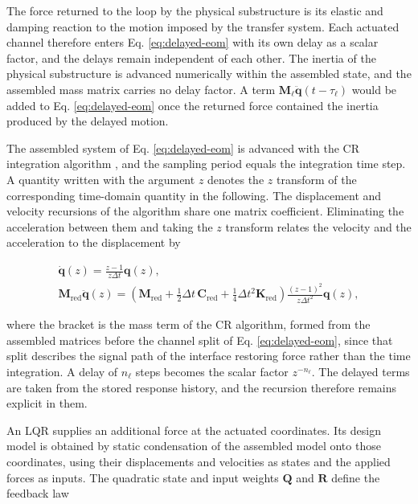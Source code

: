 \documentclass[a4paper,fleqn,review,12pt]{cas-sc}
\numberwithin{equation}{section}
\newcommand{\rev}[1]{{\color{red}#1}}
\begin{document}
The force returned to the loop by the physical substructure is its elastic and damping reaction to the motion imposed by the transfer system. Each actuated channel therefore enters Eq. \eqref{eq:delayed-eom} with its own delay as a scalar factor, and the delays remain independent of each other. The inertia of the physical substructure is advanced numerically within the assembled state, and the assembled mass matrix carries no delay factor. A term \(\mathbf{M}_{\ell}\ddot{\bm{q}}(t-\tau_{\ell})\) would be added to Eq. \eqref{eq:delayed-eom} once the returned force contained the inertia produced by the delayed motion.

The assembled system of Eq. \eqref{eq:delayed-eom} is advanced with the CR integration algorithm \rev{\cite{ChenCR2008}}, and the sampling period equals the integration time step. A quantity written with the argument \(z\) denotes the \(z\) transform of the corresponding time-domain quantity in the following. The displacement and velocity recursions of the algorithm share one matrix coefficient. Eliminating the acceleration between them and taking the \(z\) transform relates the velocity and the acceleration to the displacement by

\begin{equation}
	\begin{gathered}
		\dot{\bm{q}}(z)=\frac{z-1}{z\Delta t}\bm{q}(z),\\
		\mathbf{M}_{\mathrm{red}}\ddot{\bm{q}}(z)=
		\left(\mathbf{M}_{\mathrm{red}}
		+\tfrac{1}{2}\Delta t\,\mathbf{C}_{\mathrm{red}}
		+\tfrac{1}{4}\Delta t^{2}\mathbf{K}_{\mathrm{red}}\right)
		\frac{(z-1)^{2}}{z\Delta t^{2}}\bm{q}(z),
	\end{gathered}
	\label{eq:z-derivatives}
\end{equation}

\noindent where the bracket is the mass term of the CR algorithm, formed from the assembled matrices before the channel split of Eq. \eqref{eq:delayed-eom}, since that split describes the signal path of the interface restoring force rather than the time integration. A delay of \(n_{\ell}\) steps becomes the scalar factor \(z^{-n_{\ell}}\). The delayed terms are taken from the stored response history, and the recursion therefore remains explicit in them.

\rev{An LQR supplies an additional force at the actuated coordinates. Its design model is obtained by static condensation of the assembled model onto those coordinates, using their displacements and velocities as states and the applied forces as inputs. The quadratic state and input weights \(\mathbf Q\) and \(\mathbf R\) define the feedback law}
\end{document}

